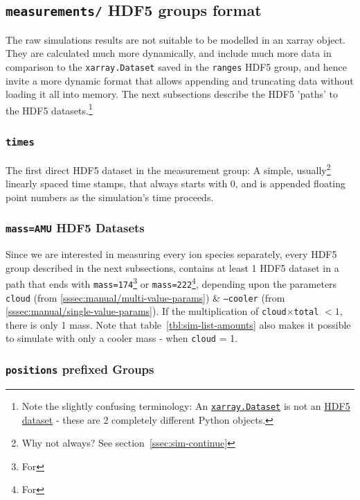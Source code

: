 \subsection{\texttt{measurements/} HDF5 groups format}\label{ssec:HDF5-measurements-format}

The raw simulations results are not suitable to be modelled in an xarray object. They are calculated much more dynamically, and include much more data in comparison to the \texttt{xarray.Dataset} saved in the \texttt{ranges} HDF5 group, and hence invite a more dynamic format that allows appending and truncating data without loading it all into memory. The next subsections describe the HDF5 'paths' to the HDF5 datasets.\footnote{Note the slightly confusing terminology: An \href{https://docs.xarray.dev/en/stable/generated/xarray.Dataset.html}{\texttt{xarray.Dataset}} is not an \href{https://docs.h5py.org/en/stable/high/dataset.html}{HDF5 dataset} - these are 2 completely different Python objects.}

\subsubsection{\texttt{times}}

The first direct HDF5 dataset in the measurement group: A simple, usually\footnote{Why not always? See section~\ref{ssec:sim-continue}} linearly spaced time stamps, that always starts with 0, and is appended floating point numbers as the simulation's time proceeds.

\subsubsection{\texttt{mass=AMU} HDF5 Datasets}

Since we are interested in measuring every ion species separately, every HDF5 group described in the next subsections, contains at least 1 HDF5 dataset in a path that ends with \texttt{mass=174}\footnote{For } or \texttt{mass=222}\footnote{For }, depending upon the parameters \texttt{cloud} (from \ref{sssec:manual/multi-value-params}) \& \texttt{--cooler} (from \ref{sssec:manual/single-value-params}). If the multiplication of \texttt{cloud}$\times$\texttt{total} $<1$, there is only 1 mass. Note that table~\ref{tbl:sim-list-amounts} also makes it possible to simulate with only a cooler mass - when \texttt{cloud} = 1.

\subsubsection{\texttt{positions} prefixed Groups}


